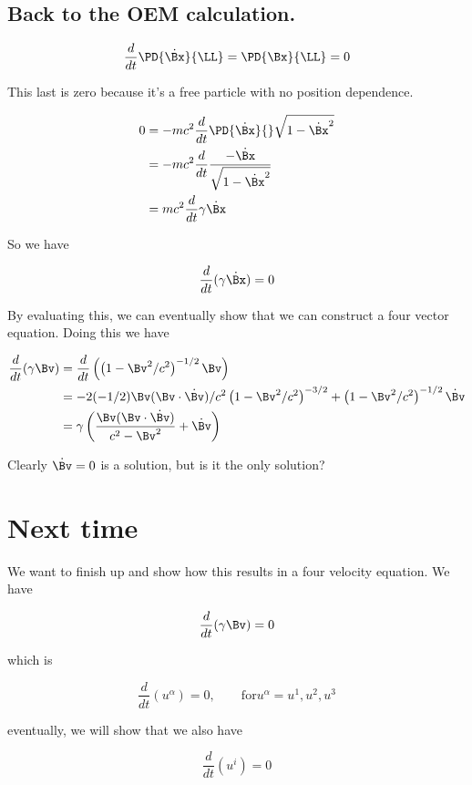 \subsection{Back to the OEM calculation.}

\begin{equation}\label{eqn:relativisticElectrodynamicsL7:240}
\frac{d}{dt} \PD{\dot{\Bx}}{\LL} = \PD{\Bx}{\LL} = 0
\end{equation}

This last is zero because it's a free particle with no position dependence.

\begin{align*}
0 
&= -m c^2 \frac{d}{dt} \PD{\dot{\Bx}}{} \sqrt{ 1 - \dot{\Bx}^2 } \\
&= -m c^2 \frac{d}{dt} \frac{- \dot{\Bx}}{\sqrt{ 1 - \dot{\Bx}^2 } } \\
&= m c^2 \frac{d}{dt} \gamma \dot\Bx
\end{align*}

So we have

\begin{equation}\label{eqn:relativisticElectrodynamicsL7:n}
\frac{d}{dt} (\gamma \dot{\Bx}) = 0
\end{equation}

By evaluating this, we can eventually show that we can construct a four vector equation.  Doing this we have

\begin{align*}
\frac{d}{dt} (\gamma \Bv) 
&=
\frac{d}{dt} \left( \left(1 - \Bv^2/c^2\right)^{-1/2} \Bv \right) \\
&=
-2 (-1/2) \Bv (\Bv \cdot \dot{\Bv})/c^2 \left(1 - \Bv^2/c^2\right)^{-3/2} + \left(1 - \Bv^2/c^2\right)^{-1/2} \dot{\Bv} \\
&=
\gamma \left( \frac{\Bv (\Bv \cdot \dot{\Bv}) }{ c^2 - \Bv^2 } + \dot{\Bv} \right)
\end{align*}

Clearly $\dot{\Bv} = 0$ is a solution, but is it the only solution?

\section{Next time}

We want to finish up and show how this results in a four velocity equation.  We have

\begin{equation}\label{eqn:relativisticElectrodynamicsL7:250}
\frac{d}{dt} ( \gamma \Bv) = 0
\end{equation}

which is

\begin{equation}\label{eqn:relativisticElectrodynamicsL7:260}
\frac{d}{dt} ( u^\alpha ) = 0, \qquad \text{for} u^\alpha = u^1, u^2, u^3
\end{equation}

eventually, we will show that we also have

\begin{equation}\label{eqn:relativisticElectrodynamicsL7:270}
\frac{d}{dt} ( u^i ) = 0
\end{equation}

\EndArticle
